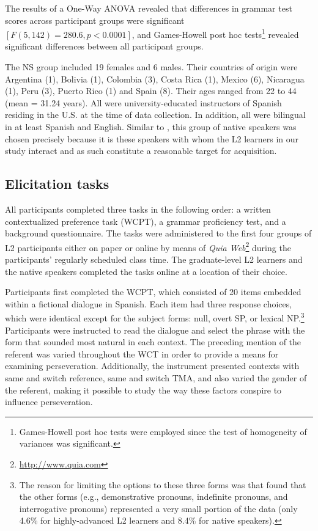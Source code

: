\documentclass[output=paper]{langscibook}
\begin{document}
The results of a One-Way ANOVA revealed that differences in grammar test scores across participant groups were significant $[F(5,142) = 280.6,\allowbreak p < 0.0001]$, and Games-Howell post hoc tests\footnote{Games-Howell post hoc tests were employed since the test of homogeneity of variances was significant.} revealed significant differences between all participant groups.



The NS group included 19 females and 6 males. Their countries of origin were Argentina (1), Bolivia (1), Colombia (3), Costa Rica (1), Mexico (6), Nicaragua (1), Peru (3), Puerto Rico (1) and Spain (8). Their ages ranged from 22 to 44 (mean = 31.24 years). All were university-educated instructors of Spanish residing in the U.S. at the time of data collection. In addition, all were bilingual in at least Spanish and English. Similar to \citet{GeeslinGudmestad2008}, this group of native speakers was chosen precisely because it is these speakers with whom the L2 learners in our study interact and as such constitute a reasonable target for acquisition.



\subsection{Elicitation tasks}\label{sec:geeslin:5.2}\largerpage
All participants completed three tasks in the following order: a written contextualized preference task (WCPT), a grammar proficiency test, and a background questionnaire. The tasks were administered to the first four groups of L2 participants either on paper or online by means of \textit{Quia Web}\footnote{\url{http://www.quia.com}} during the participants’ regularly scheduled class time. The graduate-level L2 learners and the native speakers completed the tasks online at a location of their choice.


Participants first completed the WCPT, which consisted of 20 items embedded within a fictional dialogue in Spanish. Each item had three response choices, which were identical except for the subject forms: null, overt SP, or lexical NP.\footnote{The reason for limiting the options to these three forms was that \citet{GeeslinGudmestad2008} found that the other forms (e.g., demonstrative pronouns, indefinite pronouns, and interrogative pronouns) represented a very small portion of the data (only 4.6\% for highly-advanced L2 learners and 8.4\% for native speakers).} Participants were instructed to read the dialogue and select the phrase with the form that sounded most natural in each context. The preceding mention of the referent was varied throughout the WCT in order to provide a means for examining perseveration. Additionally, the instrument presented contexts with same and switch reference, same and switch TMA, and also varied the gender of the referent, making it possible to study the way these factors conspire to influence perseveration.
\end{document}
